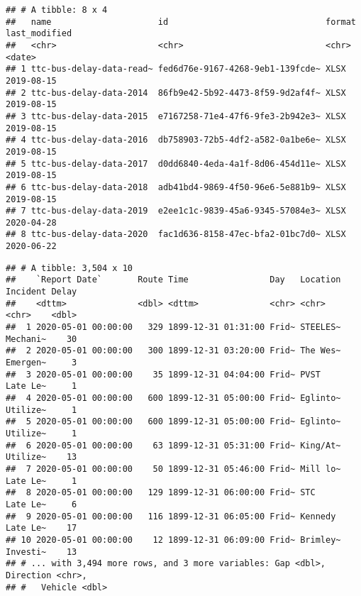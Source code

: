 \documentclass[
]{article}
\newenvironment{Shaded}{\begin{snugshade}}{\end{snugshade}}
\newcommand{\CommentTok}[1]{\textcolor[rgb]{0.56,0.35,0.01}{\textit{#1}}}
\newcommand{\DataTypeTok}[1]{\textcolor[rgb]{0.13,0.29,0.53}{#1}}
\newcommand{\DecValTok}[1]{\textcolor[rgb]{0.00,0.00,0.81}{#1}}
\newcommand{\KeywordTok}[1]{\textcolor[rgb]{0.13,0.29,0.53}{\textbf{#1}}}
\newcommand{\NormalTok}[1]{#1}
\newcommand{\OperatorTok}[1]{\textcolor[rgb]{0.81,0.36,0.00}{\textbf{#1}}}
\newcommand{\StringTok}[1]{\textcolor[rgb]{0.31,0.60,0.02}{#1}}
\begin{document}
\begin{verbatim}
## # A tibble: 8 x 4
##   name                     id                               format last_modified
##   <chr>                    <chr>                            <chr>  <date>       
## 1 ttc-bus-delay-data-read~ fed6d76e-9167-4268-9eb1-139fcde~ XLSX   2019-08-15   
## 2 ttc-bus-delay-data-2014  86fb9e42-5b92-4473-8f59-9d2af4f~ XLSX   2019-08-15   
## 3 ttc-bus-delay-data-2015  e7167258-71e4-47f6-9fe3-2b942e3~ XLSX   2019-08-15   
## 4 ttc-bus-delay-data-2016  db758903-72b5-4df2-a582-0a1be6e~ XLSX   2019-08-15   
## 5 ttc-bus-delay-data-2017  d0dd6840-4eda-4a1f-8d06-454d11e~ XLSX   2019-08-15   
## 6 ttc-bus-delay-data-2018  adb41bd4-9869-4f50-96e6-5e881b9~ XLSX   2019-08-15   
## 7 ttc-bus-delay-data-2019  e2ee1c1c-9839-45a6-9345-57084e3~ XLSX   2020-04-28   
## 8 ttc-bus-delay-data-2020  fac1d636-8158-47ec-bfa2-01bc7d0~ XLSX   2020-06-22
\end{verbatim}

\begin{Shaded}
\end{Shaded}

\begin{verbatim}
## # A tibble: 3,504 x 10
##    `Report Date`       Route Time                Day   Location Incident Delay
##    <dttm>              <dbl> <dttm>              <chr> <chr>    <chr>    <dbl>
##  1 2020-05-01 00:00:00   329 1899-12-31 01:31:00 Frid~ STEELES~ Mechani~    30
##  2 2020-05-01 00:00:00   300 1899-12-31 03:20:00 Frid~ The Wes~ Emergen~     3
##  3 2020-05-01 00:00:00    35 1899-12-31 04:04:00 Frid~ PVST     Late Le~     1
##  4 2020-05-01 00:00:00   600 1899-12-31 05:00:00 Frid~ Eglinto~ Utilize~     1
##  5 2020-05-01 00:00:00   600 1899-12-31 05:00:00 Frid~ Eglinto~ Utilize~     1
##  6 2020-05-01 00:00:00    63 1899-12-31 05:31:00 Frid~ King/At~ Utilize~    13
##  7 2020-05-01 00:00:00    50 1899-12-31 05:46:00 Frid~ Mill lo~ Late Le~     1
##  8 2020-05-01 00:00:00   129 1899-12-31 06:00:00 Frid~ STC      Late Le~     6
##  9 2020-05-01 00:00:00   116 1899-12-31 06:05:00 Frid~ Kennedy  Late Le~    17
## 10 2020-05-01 00:00:00    12 1899-12-31 06:09:00 Frid~ Brimley~ Investi~    13
## # ... with 3,494 more rows, and 3 more variables: Gap <dbl>, Direction <chr>,
## #   Vehicle <dbl>
\end{verbatim}
\end{document}
